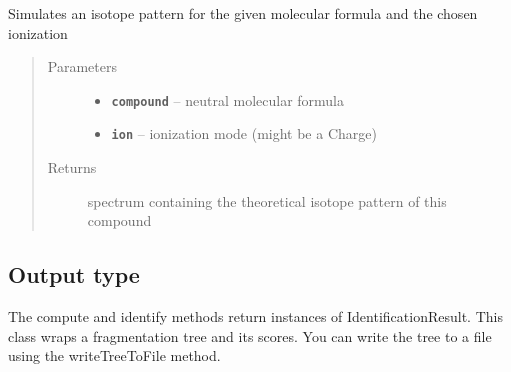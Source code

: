 \documentclass[letterpaper,10pt,openany,oneside]{sphinxmanual}
\begin{document}
\begin{fulllineitems}
\label{library:de.unijena.bioinf.sirius.simulateIsotopePattern(MolecularFormula, Ionization)}
Simulates an isotope pattern for the given molecular formula and the chosen ionization
\begin{quote}\begin{description}
\item[{Parameters}] \leavevmode\begin{itemize}
\item {} 
\textbf{\texttt{compound}} -- neutral molecular formula

\item {} 
\textbf{\texttt{ion}} -- ionization mode (might be a Charge)

\end{itemize}

\item[{Returns}] \leavevmode
spectrum containing the theoretical isotope pattern of this compound

\end{description}\end{quote}

\end{fulllineitems}



\subsection{Output type}
\label{library:package-de.unijena.bioinf.sirius}\label{library:output-type}

\begin{fulllineitems}
\label{library:de.unijena.bioinf.sirius.IdentificationResult}
The compute and identify methods return instances of
IdentificationResult. This class wraps a fragmentation tree and its scores. You can write the tree to a file using the writeTreeToFile method.

\end{fulllineitems}

\end{document}
